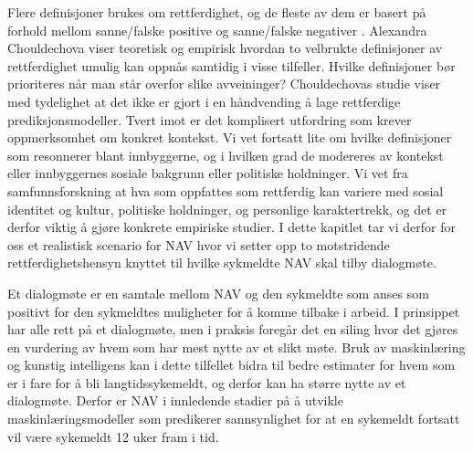 \documentclass[
  12pt,
  a4paper, 12pt]{article}
\begin{document}
Flere definisjoner brukes om rettferdighet, og de fleste av dem er basert på forhold mellom sanne/falske positive og sanne/falske negativer \citep{verma2018fairness}.
Alexandra Chouldechova \citeyearpar{chouldechova2018case} viser teoretisk og empirisk hvordan to velbrukte definisjoner av rettferdighet umulig kan oppnås samtidig i visse tilfeller.
Hvilke definisjoner bør prioriteres når man står overfor slike avveininger?
Chouldechovas studie viser med tydelighet at det ikke er gjort i en håndvending å lage rettferdige prediksjonsmodeller.
Tvert imot er det komplisert utfordring som krever oppmerksomhet om konkret kontekst.
Vi vet fortsatt lite om hvilke definisjoner som resonnerer blant innbyggerne, og i hvilken grad de modereres av kontekst eller innbyggernes sosiale bakgrunn eller politiske holdninger.
Vi vet fra samfunnsforskning at hva som oppfattes som rettferdig kan variere med sosial identitet og kultur, politiske holdninger, og personlige karaktertrekk, og det er derfor viktig å gjøre konkrete empiriske studier.
I dette kapitlet tar vi derfor for oss et realistisk scenario for NAV hvor vi setter opp to motstridende rettferdighetshensyn knyttet til hvilke sykmeldte NAV skal tilby dialogmøte.

Et dialogmøte er en samtale mellom NAV og den sykmeldte som anses som positivt for den sykmeldtes muligheter for å komme tilbake i arbeid.
I prinsippet har alle rett på et dialogmøte, men i praksis foregår det en siling hvor det gjøres en vurdering av hvem som har mest nytte av et slikt møte.
Bruk av maskinlæring og kunstig intelligens kan i dette tilfellet bidra til bedre estimater for hvem som er i fare for å bli langtidssykemeldt, og derfor kan ha større nytte av et dialogmøte.
Derfor er NAV i innledende stadier på å utvikle maskinlæringsmodeller som predikerer sannsynlighet for at en sykemeldt fortsatt vil være sykemeldt 12 uker fram i tid.
\end{document}
